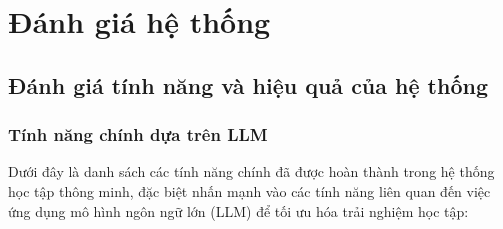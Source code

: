 \chapter{Đánh giá hệ thống}

\section{Đánh giá tính năng và hiệu quả của hệ thống}

\subsection{Tính năng chính dựa trên LLM}

Dưới đây là danh sách các tính năng chính đã được hoàn thành trong hệ thống học tập thông minh, đặc biệt nhấn mạnh vào các tính năng liên quan đến việc ứng dụng mô hình ngôn ngữ lớn (LLM) để tối ưu hóa trải nghiệm học tập:

